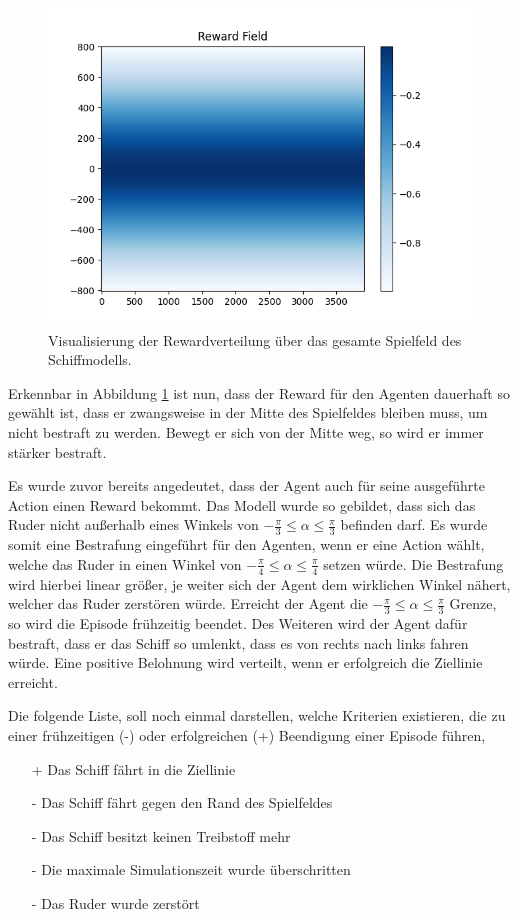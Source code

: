 \documentclass[]{iat}
\begin{document}
\begin{figure}[H]
    \includegraphics[width=\textwidth]{graphics/reward_field.png}
    \centering
    \caption{Visualisierung der Rewardverteilung über das gesamte Spielfeld des Schiffmodells.}
    \label{abb:reward_field}
\end{figure}

Erkennbar in Abbildung \ref{abb:reward_field} ist nun, dass der Reward für den Agenten dauerhaft so gewählt ist, dass er zwangsweise in der Mitte des Spielfeldes bleiben muss, um nicht bestraft zu werden. Bewegt er sich von der Mitte weg, so wird er immer stärker bestraft.

Es wurde zuvor bereits angedeutet, dass der Agent auch für seine ausgeführte Action einen Reward bekommt. Das Modell wurde so gebildet, dass sich das Ruder nicht außerhalb eines Winkels von $-\frac{\pi}{3} \leq \alpha \leq \frac{\pi}{3}$ befinden darf. Es wurde somit eine Bestrafung eingeführt für den Agenten, wenn er eine Action wählt, welche das Ruder in einen Winkel von $-\frac{\pi}{4} \leq \alpha \leq \frac{\pi}{4}$ setzen würde. Die Bestrafung wird hierbei linear größer, je weiter sich der Agent dem wirklichen Winkel nähert, welcher das Ruder zerstören würde. Erreicht der Agent die $-\frac{\pi}{3} \leq \alpha \leq \frac{\pi}{3}$ Grenze, so wird die Episode frühzeitig beendet. Des Weiteren wird der Agent dafür bestraft, dass er das Schiff so umlenkt, dass es von rechts nach links fahren würde. Eine positive Belohnung wird verteilt, wenn er erfolgreich die Ziellinie erreicht.

Die folgende Liste, soll noch einmal darstellen, welche Kriterien existieren, die zu einer frühzeitigen (-) oder erfolgreichen (+) Beendigung einer Episode führen,
\begin{enumerate}
    \item[+] Das Schiff fährt in die Ziellinie
    \item[-] Das Schiff fährt gegen den Rand des Spielfeldes
    \item[-] Das Schiff besitzt keinen Treibstoff mehr
    \item[-] Die maximale Simulationszeit wurde überschritten
    \item[-] Das Ruder wurde zerstört
\end{enumerate}
\end{document}
